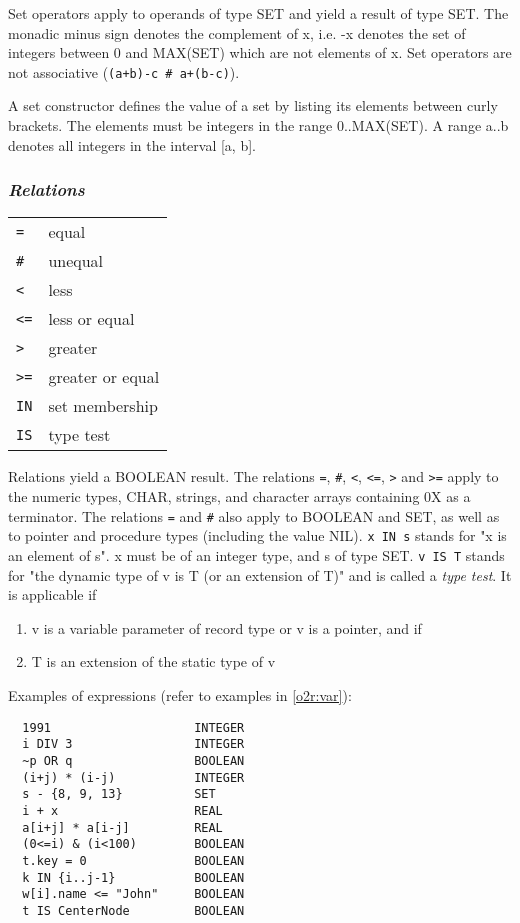 \noindent
Set operators apply to operands of type SET and yield a result of
type SET. The monadic minus sign denotes the complement of x, i.e.
-x denotes the set of integers between 0 and MAX(SET) which are not
elements of x. Set operators are not associative (\verb|(a+b)-c # a+(b-c)|).

A set constructor defines the value of a set by listing its elements
between curly brackets. The elements must be integers in the range
0..MAX(SET). A range a..b denotes all integers in the interval [a,
b].

\subsubsection{\em Relations}

\begin{tabular}{ll}
        \verb|=| &  equal               \\
        \verb|#| &  unequal             \\
        \verb|<| &  less                \\
        \verb|<=|&  less or equal       \\
        \verb|>| &  greater             \\
        \verb|>=|&  greater or equal    \\
        \verb|IN|&  set membership      \\
        \verb|IS|&  type test           \\
\end{tabular}

\noindent
Relations yield a BOOLEAN result. The relations \verb|=|,
\verb|#|, \verb|<|, \verb|<=|, \verb|>| and \verb|>=|
apply to the numeric types, CHAR, strings, and character arrays containing
0X as a terminator.
The relations \verb|=| and \verb|#|
also apply to BOOLEAN and SET, as well
as to pointer and procedure types (including the value NIL).
\verb|x IN s| stands for "x is an element of s". x must be of an integer
type, and s of type SET.
\verb|v IS T| stands for "the dynamic type of v is T (or an extension of
T)" and is called a {\em type test}. It is applicable if
\begin{enumerate}
\item
     v is a variable parameter of record type or v is
     a pointer, and if
\item
     T is an extension of the static type of v
\end{enumerate}

\noindent
Examples of expressions (refer to examples in \ref{o2r:var}):
\begin{verbatim}
  1991                    INTEGER
  i DIV 3                 INTEGER
  ~p OR q                 BOOLEAN
  (i+j) * (i-j)           INTEGER
  s - {8, 9, 13}          SET
  i + x                   REAL
  a[i+j] * a[i-j]         REAL
  (0<=i) & (i<100)        BOOLEAN
  t.key = 0               BOOLEAN
  k IN {i..j-1}           BOOLEAN
  w[i].name <= "John"     BOOLEAN
  t IS CenterNode         BOOLEAN
\end{verbatim}

